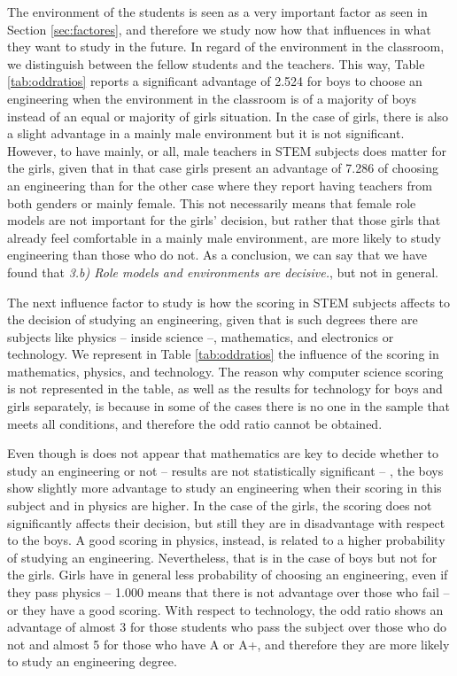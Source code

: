 \documentclass[journal,transmag]{IEEEtran}
\begin{document}
The environment of the students is seen as a very important factor as seen in Section \ref{sec:factores}, and therefore we study now how that influences in what they want to study in the future. In regard of the environment in the classroom, we distinguish between the fellow students and the teachers. This way, Table \ref{tab:oddratios} reports a significant advantage of 2.524 for boys to choose an engineering when the environment in the classroom is of a majority of boys instead of an equal or majority of girls situation. In the case of girls, there is also a slight advantage in a mainly male environment but it is not significant. However, to have mainly, or all, male teachers in STEM subjects does matter for the girls, given that in that case girls present an advantage of 7.286 of choosing an engineering than for the other case where they report having teachers from both genders or mainly female. This not necessarily means that female role models are not important for the girls' decision, but rather that those girls that already feel comfortable in a mainly male environment, are more likely to study engineering than those who do not. As a conclusion, we can say that we have found that \textit{3.b) Role models and environments are decisive.}, but not in general.

The next influence factor to study is how the scoring in STEM subjects affects to the decision of studying an engineering, given that is such degrees there are subjects like physics -- inside science --, mathematics, and electronics or technology. We represent in Table \ref{tab:oddratios} the influence of the scoring in mathematics, physics, and technology. The reason why computer science scoring is not represented in the table, as well as the results for technology for boys and girls separately, is because in some of the cases there is no one in the sample that meets all conditions, and therefore the odd ratio cannot be obtained.

Even though is does not appear that mathematics are key to decide whether to study an engineering or not -- results are not statistically significant -- , the boys show slightly more advantage to study an engineering when their scoring in this subject and in physics are higher. In the case of the girls, the scoring does not significantly affects their decision, but still they are in disadvantage with respect to the boys. A good scoring in physics, instead, is related to a higher probability of studying an engineering. Nevertheless, that is in the case of boys but not for the girls. Girls have in general less probability of choosing an engineering, even if they pass physics -- 1.000 means that there is not advantage over those who fail -- or they have a good scoring. With respect to technology, the odd ratio shows an advantage of almost 3 for those students who pass the subject over those who do not and almost 5 for those who have A or A+, and therefore they are more likely to study an engineering degree.
\end{document}
